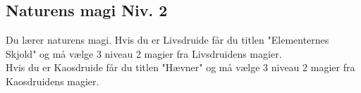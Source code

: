 \subsection{Naturens magi Niv. 2}
Du lærer naturens magi. Hvis du er Livsdruide får du titlen "Elementernes Skjold" og må vælge 3 niveau 2 magier fra Livsdruidens magier.\\ Hvis du er Kaosdruide får du titlen "Hævner" og må vælge 3 niveau 2 magier fra Kaosdruidens magier.\\